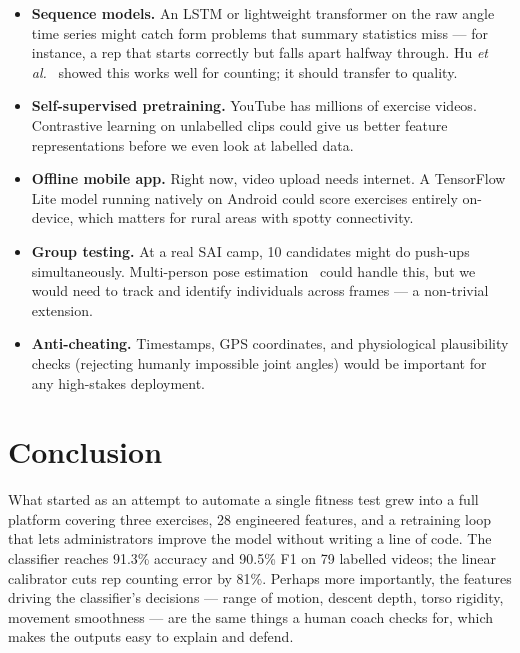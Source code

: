 \documentclass[conference]{IEEEtran}
\begin{document}
\begin{itemize}
    \item \textbf{Sequence models.} An LSTM or lightweight transformer on the raw angle time series might catch form problems that summary statistics miss --- for instance, a rep that starts correctly but falls apart halfway through. Hu \textit{et al.}~\cite{hu2022} showed this works well for counting; it should transfer to quality.
    \item \textbf{Self-supervised pretraining.} YouTube has millions of exercise videos. Contrastive learning on unlabelled clips could give us better feature representations before we even look at labelled data.
    \item \textbf{Offline mobile app.} Right now, video upload needs internet. A TensorFlow Lite model running natively on Android could score exercises entirely on-device, which matters for rural areas with spotty connectivity.
    \item \textbf{Group testing.} At a real SAI camp, 10 candidates might do push-ups simultaneously. Multi-person pose estimation~\cite{cao2017} could handle this, but we would need to track and identify individuals across frames --- a non-trivial extension.
    \item \textbf{Anti-cheating.} Timestamps, GPS coordinates, and physiological plausibility checks (rejecting humanly impossible joint angles) would be important for any high-stakes deployment.
\end{itemize}

\section{Conclusion}

What started as an attempt to automate a single fitness test grew into a full platform covering three exercises, 28 engineered features, and a retraining loop that lets administrators improve the model without writing a line of code. The classifier reaches 91.3\% accuracy and 90.5\% F1 on 79 labelled videos; the linear calibrator cuts rep counting error by 81\%. Perhaps more importantly, the features driving the classifier's decisions --- range of motion, descent depth, torso rigidity, movement smoothness --- are the same things a human coach checks for, which makes the outputs easy to explain and defend.
\end{document}
